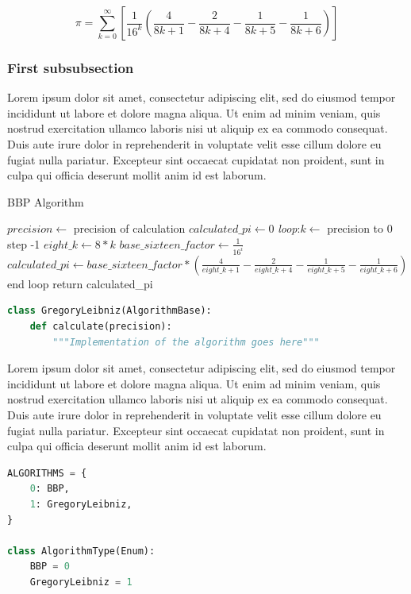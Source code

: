 \documentclass[11pt]{article}
\begin{document}
$$\pi = \sum_{k=0}^{\infty} [\frac{1}{16^k}(\frac{4}{8k+1} -\frac{2}{8k+4} - \frac{1}{8k+5} - \frac{1}{8k+6})] $$

\subsubsection{First subsubsection}
Lorem ipsum dolor sit amet, consectetur adipiscing elit, sed do eiusmod tempor incididunt ut labore et dolore magna aliqua. Ut enim ad minim veniam, quis nostrud exercitation ullamco laboris nisi ut aliquip ex ea commodo consequat. Duis aute irure dolor in reprehenderit in voluptate velit esse cillum dolore eu fugiat nulla pariatur. Excepteur sint occaecat cupidatat non proident, sunt in culpa qui officia deserunt mollit anim id est laborum.
\begin{algorithm}
\caption{BBP Algorithm}
\begin{algorithmic}
\STATE $precision \leftarrow $ precision of calculation
\STATE $calculated\_pi \leftarrow 0$
\STATE \emph{loop}:${ k} \leftarrow $ precision to 0 step -1
\STATE $eight\_k \leftarrow 8 * k$
\STATE $base\_sixteen\_factor \leftarrow \frac{1}{16^i}$
\STATE $calculated\_pi \leftarrow base\_sixteen\_factor * (\frac{4}{eight\_k+1} - \frac{2}{eight\_k+4}- \frac{1}{eight\_k+5} - \frac{1}{eight\_k+6})$
\STATE end loop
\STATE return calculated\_pi
\end{algorithmic}
\end{algorithm}

\begin{lstlisting}[language=python]
class GregoryLeibniz(AlgorithmBase):
	def calculate(precision):
		"""Implementation of the algorithm goes here"""
\end{lstlisting}
Lorem ipsum dolor sit amet, consectetur adipiscing elit, sed do eiusmod tempor incididunt ut labore et dolore magna aliqua. Ut enim ad minim veniam, quis nostrud exercitation ullamco laboris nisi ut aliquip ex ea commodo consequat. Duis aute irure dolor in reprehenderit in voluptate velit esse cillum dolore eu fugiat nulla pariatur. Excepteur sint occaecat cupidatat non proident, sunt in culpa qui officia deserunt mollit anim id est laborum.
\begin{lstlisting}[language=python]
ALGORITHMS = {
    0: BBP,
    1: GregoryLeibniz,
}

class AlgorithmType(Enum):
    BBP = 0
    GregoryLeibniz = 1
\end{lstlisting}



\end{document}

